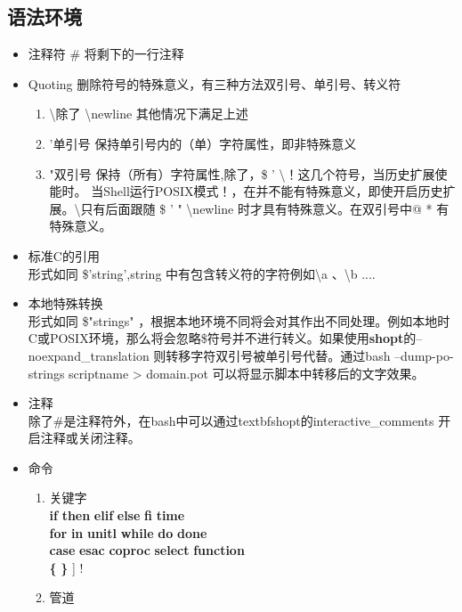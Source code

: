 \subsection{语法环境}
	\begin{itemize}
		\item 注释符 \# 将剩下的一行注释
		\item Quoting 删除符号的特殊意义，有三种方法双引号、单引号、转义符
			\begin{enumerate}
				\item \textbackslash \quad 除了 \textbackslash newline 其他情况下满足上述
				\item '\quad 单引号 保持单引号内的（单）字符属性，即非特殊意义
				\item "\quad 双引号 保持（所有）字符属性,除了，\$ ' \textbackslash ！这几个符号，当历史扩展使能时。 当Shell运行POSIX模式！，在并不能有特殊意义，即使开启历史扩展。\textbackslash 只有后面跟随 \$ ' " \textbackslash newline 时才具有特殊意义。在双引号中@ * 有特殊意义。
			\end{enumerate}
		\item  标准C的引用\\
		形式如同 \$'string',string 中有包含转义符的字符例如\textbackslash a 、\textbackslash b ....
		\item  本地特殊转换\\
		形式如同 \$"strings" ，根据本地环境不同将会对其作出不同处理。例如本地时C或POSIX环境，那么将会忽略\$符号并不进行转义。如果使用\textbf{shopt}的--noexpand\_translation 则转移字符双引号被单引号代替。通过bash --dump-po-strings scriptname > domain.pot 可以将显示脚本中转移后的文字效果。
		\item 注释\\
		除了\#是注释符外，在bash中可以通过textbf{shopt}的interactive\_comments 开启注释或关闭注释。
		\item 命令
			\begin{enumerate}
				\item 关键字\\
				\textbf{if} \textbf{then} \textbf{elif} \textbf{else} \textbf{fi} \textbf{time} \\
				\textbf{for} \textbf{in} \textbf{unitl} \textbf{while} \textbf{do} \textbf{done}\\
				\textbf{case} \textbf{esac} \textbf{coproc} \textbf{select} \textbf{function}\\
				\textbf {\{}  \qquad\textbf {\}} \qquad [[\quad]] \qquad !
				\item 管道\\

\end{enumerate}
\end{itemize}

